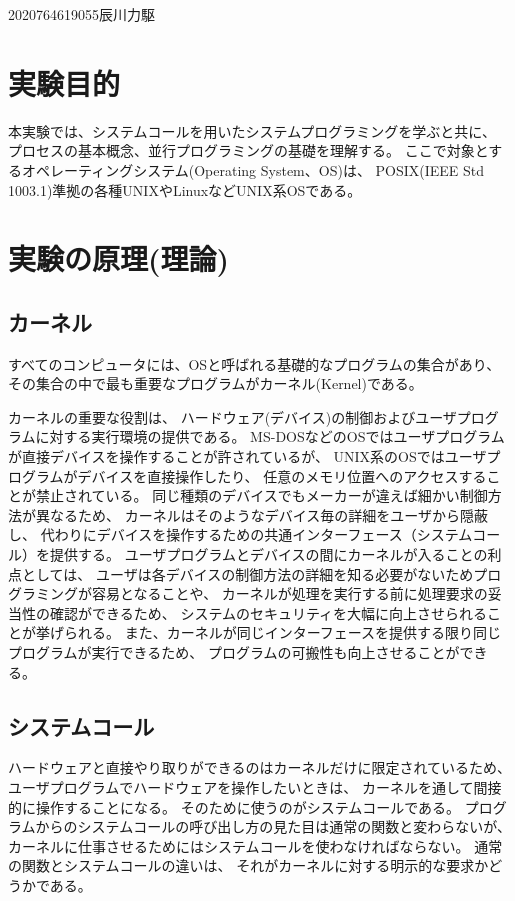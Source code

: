 \documentclass[12pt]{jarticle}
\begin{document}
{2020}{7}{6}{4619055}{辰川力駆}

\section{実験目的}
本実験では、システムコールを用いたシステムプログラミングを学ぶと共に、
プロセスの基本概念、並行プログラミングの基礎を理解する。
ここで対象とするオペレーティングシステム(Operating System、OS)は、
POSIX(IEEE Std 1003.1)準拠の各種UNIXやLinuxなどUNIX系OSである。

\section{実験の原理(理論)}
\subsection{カーネル}
すべてのコンピュータには、OSと呼ばれる基礎的なプログラムの集合があり、
その集合の中で最も重要なプログラムがカーネル(Kernel)である。

カーネルの重要な役割は、
ハードウェア(デバイス)の制御およびユーザプログラムに対する実行環境の提供である。
MS-DOSなどのOSではユーザプログラムが直接デバイスを操作することが許されているが、
UNIX系のOSではユーザプログラムがデバイスを直接操作したり、
任意のメモリ位置へのアクセスすることが禁止されている。
同じ種類のデバイスでもメーカーが違えば細かい制御方法が異なるため、
カーネルはそのようなデバイス毎の詳細をユーザから隠蔽し、
代わりにデバイスを操作するための共通インターフェース（システムコール）を提供する。
ユーザプログラムとデバイスの間にカーネルが入ることの利点としては、
ユーザは各デバイスの制御方法の詳細を知る必要がないためプログラミングが容易となることや、
カーネルが処理を実行する前に処理要求の妥当性の確認ができるため、
システムのセキュリティを大幅に向上させられることが挙げられる。
また、カーネルが同じインターフェースを提供する限り同じプログラムが実行できるため、
プログラムの可搬性も向上させることができる。

\subsection{システムコール}
ハードウェアと直接やり取りができるのはカーネルだけに限定されているため、
ユーザプログラムでハードウェアを操作したいときは、
カーネルを通して間接的に操作することになる。
そのために使うのがシステムコールである。
プログラムからのシステムコールの呼び出し方の見た目は通常の関数と変わらないが、
カーネルに仕事させるためにはシステムコールを使わなければならない。
通常の関数とシステムコールの違いは、
それがカーネルに対する明示的な要求かどうかである。
\end{document}
